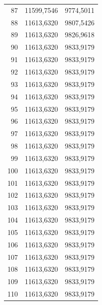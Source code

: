 \begin{small}
\begin{longtable}{rrr}
87 & 11599,7546 & 9774,5011 \\
88 & 11613,6320 & 9807,5426 \\
89 & 11613,6320 & 9826,9618 \\
90 & 11613,6320 & 9833,9179 \\
91 & 11613,6320 & 9833,9179 \\
92 & 11613,6320 & 9833,9179 \\
93 & 11613,6320 & 9833,9179 \\
94 & 11613,6320 & 9833,9179 \\
95 & 11613,6320 & 9833,9179 \\
96 & 11613,6320 & 9833,9179 \\
97 & 11613,6320 & 9833,9179 \\
98 & 11613,6320 & 9833,9179 \\
99 & 11613,6320 & 9833,9179 \\
100 & 11613,6320 & 9833,9179 \\
101 & 11613,6320 & 9833,9179 \\
102 & 11613,6320 & 9833,9179 \\
103 & 11613,6320 & 9833,9179 \\
104 & 11613,6320 & 9833,9179 \\
105 & 11613,6320 & 9833,9179 \\
106 & 11613,6320 & 9833,9179 \\
107 & 11613,6320 & 9833,9179 \\
108 & 11613,6320 & 9833,9179 \\
109 & 11613,6320 & 9833,9179 \\
110 & 11613,6320 & 9833,9179 \\
\end{longtable}
\end{small}
